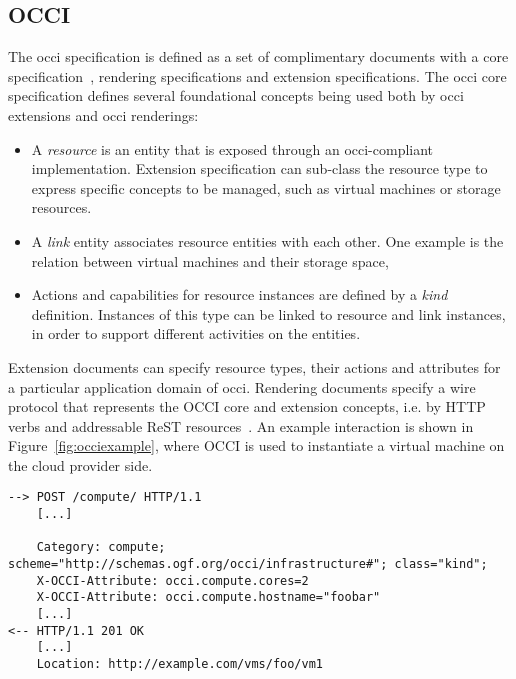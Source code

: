 \documentclass[twocolumn]{svjour3}       %
\begin{document}


\subsection{OCCI}

The \gls{occi} specification is defined as a set of complimentary documents with a core specification~\cite{citemaster_9270}, rendering specifications and extension specifications. The \gls{occi} core specification defines several foundational concepts being used both by \gls{occi} extensions and \gls{occi} renderings:

\begin{itemize}
\item A \emph{resource} is an entity that is exposed through an \gls{occi}-compliant implementation. Extension specification can sub-class the resource type to express specific concepts to be managed, such as virtual machines or storage resources.
\item A \emph{link} entity associates resource entities with each other. One example is the relation between virtual machines and their storage space,
\item Actions and capabilities for resource instances are defined by a \emph{kind} definition. Instances of this type can be linked to resource and link instances, in order to support different activities on the entities.
\end{itemize}

Extension documents can specify resource types, their actions and attributes for a particular application domain of \gls{occi}. Rendering documents specify a wire protocol that represents the OCCI core and extension concepts, i.e. by HTTP verbs and addressable ReST resources~\cite{gfd185}. An example interaction is shown in Figure~\ref{fig:occiexample}, where OCCI is used to instantiate a virtual machine on the cloud provider side.

\begin{figure*}
\begin{lstlisting}
--> POST /compute/ HTTP/1.1 
    [...] 
    
    Category: compute; scheme="http://schemas.ogf.org/occi/infrastructure#"; class="kind"; 
    X-OCCI-Attribute: occi.compute.cores=2
    X-OCCI-Attribute: occi.compute.hostname="foobar" 
    [...]
<-- HTTP/1.1 201 OK 
    [...] 
    Location: http://example.com/vms/foo/vm1
\end{lstlisting}
\caption{Example: Creating a virtual machine instance}
\label{fig:occiexample} 
\end{figure*}
\end{document}
